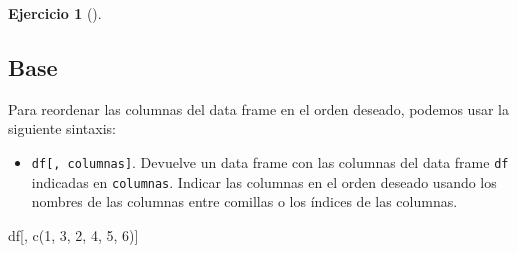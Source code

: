 \documentclass[
  a4paper,
]{scrreport}
\newenvironment{Shaded}{\begin{snugshade}}{\end{snugshade}}
\newcommand{\DecValTok}[1]{\textcolor[rgb]{0.68,0.00,0.00}{#1}}
\newcommand{\FunctionTok}[1]{\textcolor[rgb]{0.28,0.35,0.67}{#1}}
\newcommand{\NormalTok}[1]{\textcolor[rgb]{0.00,0.23,0.31}{#1}}
\providecommand{\tightlist}{%
  \setlength{\itemsep}{0pt}\setlength{\parskip}{0pt}}\usepackage{longtable,booktabs,array}
\theoremstyle{definition}
\newtheorem{exercise}{Ejercicio}[chapter]
\theoremstyle{remark}
\begin{document}
\begin{exercise}[]
\begin{enumerate}
  \begin{tcolorbox}[enhanced jigsaw, colframe=quarto-callout-tip-color-frame, toprule=.15mm, bottomtitle=1mm, breakable, opacitybacktitle=0.6, toptitle=1mm, colback=white, bottomrule=.15mm, title=\textcolor{quarto-callout-tip-color}{\faLightbulb}\hspace{0.5em}{Solución}, arc=.35mm, left=2mm, titlerule=0mm, rightrule=.15mm, coltitle=black, leftrule=.75mm, opacityback=0, colbacktitle=quarto-callout-tip-color!10!white]

  \section{Base}

  Para reordenar las columnas del data frame en el orden deseado,
  podemos usar la siguiente sintaxis:

  \begin{itemize}
  \tightlist
  \item
    \texttt{df{[},\ columnas{]}}. Devuelve un data frame con las
    columnas del data frame \texttt{df} indicadas en \texttt{columnas}.
    Indicar las columnas en el orden deseado usando los nombres de las
    columnas entre comillas o los índices de las columnas.
  \end{itemize}

\begin{Shaded}
\begin{Highlighting}[]
\NormalTok{df[, }\FunctionTok{c}\NormalTok{(}\DecValTok{1}\NormalTok{, }\DecValTok{3}\NormalTok{, }\DecValTok{2}\NormalTok{, }\DecValTok{4}\NormalTok{, }\DecValTok{5}\NormalTok{, }\DecValTok{6}\NormalTok{)]}
\end{Highlighting}
\end{Shaded}


\end{tcolorbox}
\end{enumerate}
\end{exercise}
\end{document}
